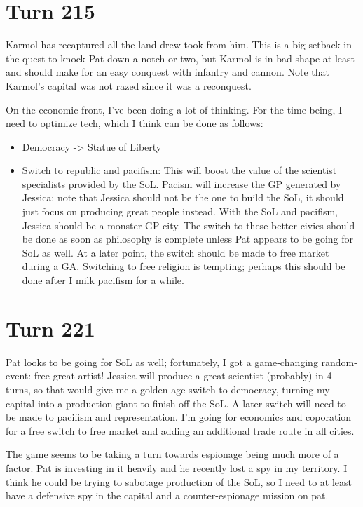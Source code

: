 \documentclass[10pt]{article}
\begin{document}
\section*{Turn 215}

Karmol has recaptured all the land drew took from him. This is a big
setback in the quest to knock Pat down a notch or two, but Karmol is
in bad shape at least and should make for an easy conquest with
infantry and cannon. Note that Karmol's capital was not razed since it
was a reconquest.

On the economic front, I've been doing a lot of thinking. For the time being, I need to optimize tech, which I think can be done as follows:
\begin{itemize}
\item Democracy -> Statue of Liberty
\item Switch to republic and pacifism: This will boost the value of the
scientist specialists provided by the SoL. Pacism will increase the GP
generated by Jessica; note that Jessica should not be the one to build
the SoL, it should just focus on producing great people instead. With
the SoL and pacifism, Jessica should be a monster GP city. The switch
to these better civics should be done as soon as philosophy is
complete unless Pat appears to be going for SoL as well. At a later
point, the switch should be made to free market during a GA. Switching
to free religion is tempting; perhaps this should be done after I milk
pacifism for a while.
\end{itemize}

\section*{Turn 221}

Pat looks to be going for SoL as well; fortunately, I got a
game-changing random-event: free great artist! Jessica will produce a
great scientist (probably) in 4 turns, so that would give me a
golden-age switch to democracy, turning my capital into a production
giant to finish off the SoL. A later switch will need to be made to
pacifism and representation. I'm going for economics and coporation
for a free switch to free market and adding an additional trade route
in all cities.

The game seems to be taking a turn towards espionage being much more
of a factor. Pat is investing in it heavily and he recently lost a spy
in my territory. I think he could be trying to sabotage production of
the SoL, so I need to at least have a defensive spy in the capital and
a counter-espionage mission on pat.
\end{document}
